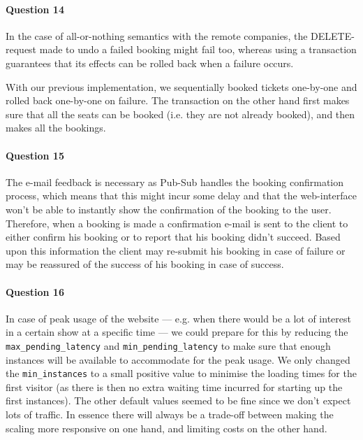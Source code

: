 \documentclass{ds-report}
\begin{document}
	\paragraph{Question 14} 
	In the case of all-or-nothing semantics with the remote companies, the DELETE-request made to undo a failed booking might fail too, whereas using a transaction guarantees that its effects can be rolled back when a failure occurs.
	
	With our previous implementation, we sequentially booked tickets one-by-one and rolled back one-by-one on failure. The transaction on the other hand first makes sure that all the seats can be booked (i.e. they are not already booked), and then makes all the bookings.
	
	\paragraph{Question 15} 
	The e-mail feedback is necessary as Pub-Sub handles the booking confirmation process, which means that this might incur some delay and that the web-interface won't be able to instantly show the confirmation of the booking to the user. Therefore, when a booking is made a confirmation e-mail is sent to the client to either confirm his booking or to report that his booking didn't succeed. Based upon this information the client may re-submit his booking in case of failure or may be reassured of the success of his booking in case of success.
	
	\paragraph{Question 16} 
	In case of peak usage of the website --- e.g. when there would be a lot of interest in a certain show at a specific time --- we could prepare for this by reducing the \texttt{max\_pending\_latency} and \texttt{min\_pending\_latency} to make sure that enough instances will be available to accommodate for the peak usage.
	We only changed the \texttt{min\_instances} to a small positive value to minimise the loading times for the first visitor (as there is then no extra waiting time incurred for starting up the first instances). The other default values seemed to be fine since we don't expect lots of traffic. In essence there will always be a trade-off between making the scaling more responsive on one hand, and limiting costs on the other hand.
	
\end{document}
